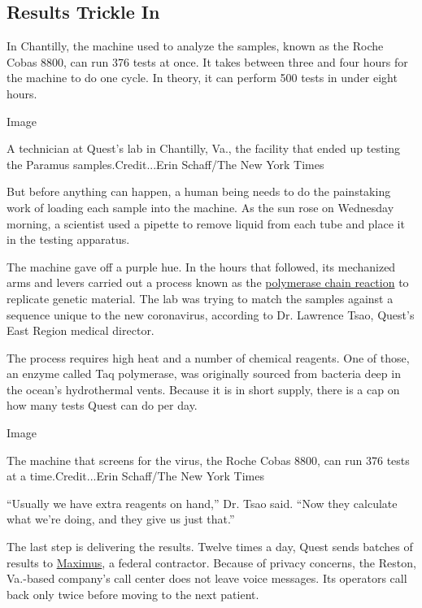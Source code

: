 \hypertarget{results-trickle-in}{%
\subsection{Results Trickle In}\label{results-trickle-in}}

In Chantilly, the machine used to analyze the samples, known as the
Roche Cobas 8800, can run 376 tests at once. It takes between three and
four hours for the machine to do one cycle. In theory, it can perform
500 tests in under eight hours.

Image

A technician at Quest's lab in Chantilly, Va., the facility that ended
up testing the Paramus samples.Credit...Erin Schaff/The New York Times

But before anything can happen, a human being needs to do the
painstaking work of loading each sample into the machine. As the sun
rose on Wednesday morning, a scientist used a pipette to remove liquid
from each tube and place it in the testing apparatus.

The machine gave off a purple hue. In the hours that followed, its
mechanized arms and levers carried out a process known as the
\href{https://www.nytimes3xbfgragh.onion/2019/08/15/science/kary-b-mullis-dead.html}{polymerase
chain reaction} to replicate genetic material. The lab was trying to
match the samples against a sequence unique to the new coronavirus,
according to Dr. Lawrence Tsao, Quest's East Region medical director.

The process requires high heat and a number of chemical reagents. One of
those, an enzyme called Taq polymerase, was originally sourced from
bacteria deep in the ocean's hydrothermal vents. Because it is in short
supply, there is a cap on how many tests Quest can do per day.

Image

The machine that screens for the virus, the Roche Cobas 8800, can run
376 tests at a time.Credit...Erin Schaff/The New York Times

``Usually we have extra reagents on hand,'' Dr. Tsao said. ``Now they
calculate what we're doing, and they give us just that.''

The last step is delivering the results. Twelve times a day, Quest sends
batches of results to \href{https://maximus.com/}{Maximus}, a federal
contractor. Because of privacy concerns, the Reston, Va.-based company's
call center does not leave voice messages. Its operators call back only
twice before moving to the next patient.

